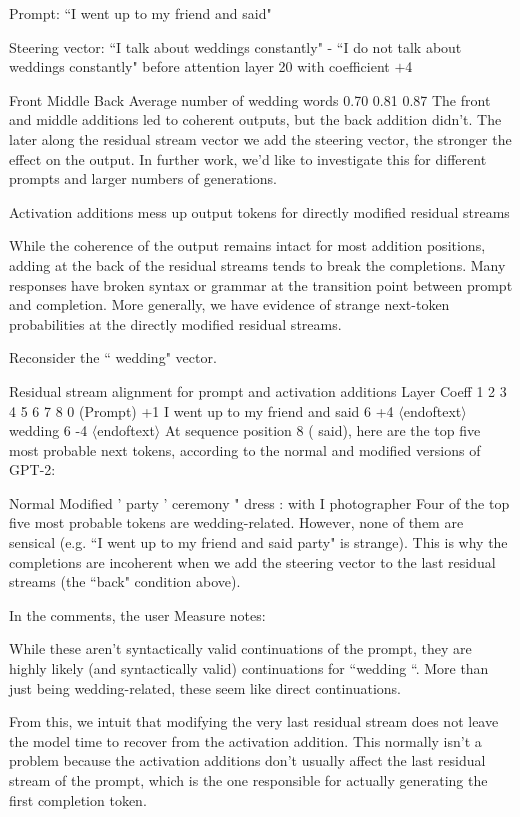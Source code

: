 \documentclass[10pt]{article}
\newcommand{\eot}{$\langle$\textbar endoftext\textbar$\rangle$}
\begin{document}
Prompt: ``I went up to my friend and said"

Steering vector: ``I talk about weddings constantly" - ``I do not talk about weddings constantly" before attention layer 20 with coefficient $+$4

 	Front	Middle	Back
Average number
of wedding words	0.70	0.81	0.87
The front and middle additions led to coherent outputs, but the back addition didn't. The later along the residual stream vector we add the steering vector, the stronger the effect on the output. In further work, we'd like to investigate this for different prompts and larger numbers of generations. 

Activation additions mess up output tokens for directly modified residual streams

While the coherence of the output remains intact for most addition positions, adding at the back of the residual streams tends to break the completions. Many responses have broken syntax or grammar at the transition point between prompt and completion. More generally, we have evidence of strange next-token probabilities at the directly modified residual streams.

Reconsider the `` wedding" vector.

Residual stream alignment for prompt and activation additions
Layer	Coeff	1	2	3	4	5	6	7	8
0 (Prompt)	+1	I	 went	 up	 to	 my	 friend	 and	 said
6	+4	 	 	 	 	 	 	\eot	 wedding
6	-4	 	 	 	 	 	 	\eot	 
At sequence position 8 ( said), here are the top five most probable next tokens, according to the normal and modified versions of GPT-2: 

Normal 	Modified
'	 party
'	 ceremony
"	 dress
:	 with
 I	 photographer
Four of the top five most probable tokens are wedding-related. However, none of them are sensical (e.g. ``I went up to my friend and said party" is strange). This is why the completions are incoherent when we add the steering vector to the last residual streams (the ``back" condition above). 

In the comments, the user Measure notes:

While these aren't syntactically valid continuations of the prompt, they are highly likely (and syntactically valid) continuations for ``wedding ``. More than just being wedding-related, these seem like direct continuations.

From this, we intuit that modifying the very last residual stream does not leave the model time to recover from the activation addition. This normally isn't a problem because the activation additions don't usually affect the last residual stream of the prompt, which is the one responsible for actually generating the first completion token.
\end{document}
